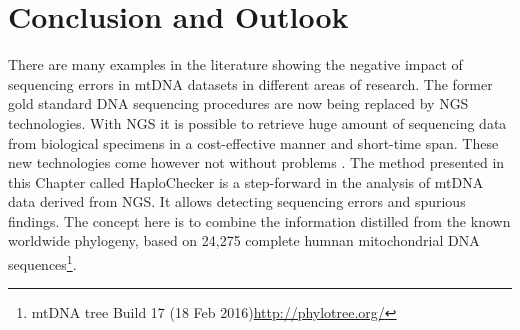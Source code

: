 \section{Conclusion and Outlook}\label{cont:outlook}
There are many examples in the literature showing the negative impact of sequencing errors in mtDNA datasets in different areas of research. The former gold standard DNA sequencing procedures are now being replaced by NGS technologies. With NGS it is possible to retrieve huge amount of sequencing data from biological specimens in a cost-effective manner and short-time span. These new technologies come however not without problems \cite{Bandelt2012a, Just2015}. The method presented in this Chapter called HaploChecker is a step-forward in the analysis of mtDNA data derived from NGS. It allows detecting sequencing errors and spurious findings. The concept here is to combine the information distilled from the known worldwide phylogeny, based on 24,275 complete humnan mitochondrial DNA sequences\footnote{mtDNA tree Build 17 (18 Feb 2016)\url{http://phylotree.org/}}. %

